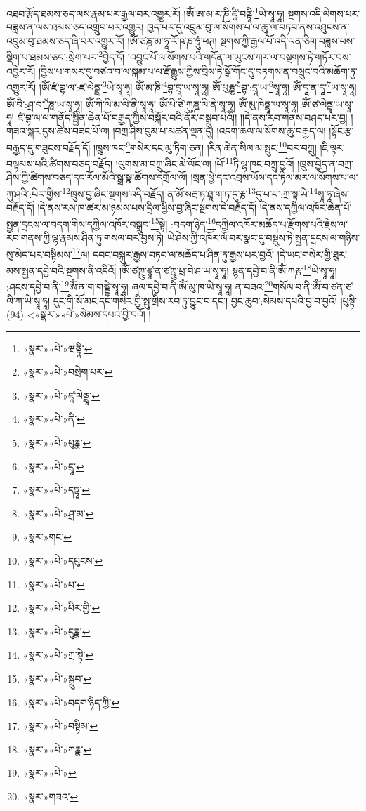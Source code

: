 འཐབ་རྩོད་ཐམས་ཅད་ལས་རྣམ་པར་རྒྱལ་བར་འགྱུར་རོ། །ཨོཾ་ཨ་མ་ར་ཎི་ཛཱི་བནྟཱི་\footnote{«སྣར་»«པེ་»ཝནྟཱི་}ཡེ་སྭཱ་ཧཱ། སྔགས་འདི་ལེགས་པར་བཟླས་ན་ལས་ཐམས་ཅད་འགྲུབ་པར་འགྱུར། ཁྱད་པར་དུ་འབྲུམ་བུ་ལ་སོགས་པ་ལ་ཆུ་ལ་བཏབ་ནས་འཐུངས་ན་འབྲུམ་བུ་ཐམས་ཅད་ཞི་བར་འགྱུར་རོ། །ཨོཾ་ཙཎྜ་མ་ཧཱ་རོ་ཥ་ཎ་ཧཱུཾ་ཕཊ། སྔགས་ཀྱི་རྒྱལ་པོ་འདི་ལན་ཅིག་བཟླས་པས་སྡིག་པ་ཐམས་ཅད་:སྲེག་པར་\footnote{«སྣར་»«པེ་»བསྲེག་པར་}བྱེད་དོ། །འབྱུང་པོ་ལ་སོགས་པའི་གདོན་ལ་ཡུངས་ཀར་ལ་བསྔགས་ཏེ་གཏོར་བས་འབྱེར་རོ། །བྱིས་པ་གསར་དུ་བཙའ་བ་ལ་སྐམ་པ་ལ་རྡོ་རྒྱུས་ཀྱིས་བྲིས་ཏེ་སྒོ་གོང་དུ་བཏགས་ན་བསྲུང་བའི་མཆོག་ཏུ་འགྱུར་རོ། །ཨོཾ་ཛཾ་བྷ་ལ་:ཛ་ལེནྡྲ་\footnote{«སྣར་»«པེ་»ཛཱ་ལེནྡྲཱ་}ཡེ་སྭཱ་ཧཱ། ཨོཾ་མ་ཎི་\footnote{«སྣར་»«པེ་»ནི་}བྷ་དྲཱ་ཡ་སྭཱ་ཧཱ། ཨོཾ་པུརྞྞ་\footnote{«སྣར་»«པེ་»པུརྞྣ་}བྷ་:དྲཱ་ཡ་\footnote{«སྣར་»«པེ་»དྲཱ་}སྭཱ་ཧཱ། ཨོཾ་དཱ་ན་དཱ་\footnote{«སྣར་»«པེ་»དཏྟཱ་}ཡ་སྭཱ་ཧཱ། ཨོཾ་བཻ་:ཤྲ་བ་\footnote{«སྣར་»«པེ་»ཤྲ་མ་}ཎཱ་ཡ་སྭཱ་ཧཱ། ཨོཾ་ཀི་ལི་མ་ལི་ནི་སྭཱ་ཧཱ། ཨོཾ་པི་ཙི་ཀུཎྜ་ལི་ནེ་སྭཱ་ཧཱ། ཨོཾ་མུ་ཁེནྡྲཱ་ཡ་སྭཱ་ཧཱ། ཨོཾ་ཙ་ལེནྡཱ་ཡ་སྭཱ་ཧཱ། ཛཾ་བྷ་ལ་ལ་གནོད་སྦྱིན་ཆེན་པོ་བརྒྱད་ཀྱིས་བསྐོར་བའི་ནོར་བསྒྲུབ་པའོ།། །།དེ་ནས་རབ་གནས་བཤད་པར་བྱ། །གཟའ་སྐར་དུས་ཚེས་བཟང་པོ་ལ། །བཀྲ་ཤིས་བུམ་པ་མཚན་ལྡན་དུ། །འདག་ཆལ་ལ་སོགས་ཆུ་བརྒྱད་ལ། །སྟོང་རྩ་བརྒྱད་དུ་གཟུངས་བརྗོད་དོ། །ཁྲུས་ཁང་\footnote{«སྣར་»གང་}གསེར་དང་མུ་ཏིག་ཅན། །རིན་ཆེན་སིལ་མ་སྤུང་\footnote{«སྣར་»«པེ་»དཔུངས་}བར་བཀྲུ། །ཇི་ལྟར་བལྟམས་པའི་ཚིགས་བཅད་བརྗོད། །ལུགས་མ་བཀྲུ་ཞིང་མེ་ལོང་ལ། །པོ་\footnote{«སྣར་»«པེ་»པ་}ཏི་ལྷ་ཁང་བཀྲུ་བྱའོ། །ཁྲུས་བྱེད་ན་བཀྲ་ཤིས་ཀྱི་ཚིགས་བཅད་དང་རོལ་མོའི་སྒྲ་སྣ་ཚོགས་དགྲོལ་ལོ། །སྲན་ཕྱེ་དང་འབྲས་ཡོས་དང་ཏིལ་མར་ལ་སོགས་པ་ལ་ཀུ་ཤའི་:པིར་གྱིས་\footnote{«སྣར་»«པེ་»པིར་གྱི་}ཁྲུས་བྱ་ཞིང་སྔགས་འདི་བརྗོད། ན་མོ་སརྦ་ཏ་ཐཱ་ག་ཏ་དུ་རྞ་\footnote{«སྣར་»«པེ་»དུརྞྣ་}དུ་པ་པ་:ཀྲ་སྟ་ཡེ་\footnote{«སྣར་»«པེ་»ཀྲ་སྟེ་}སྭཱ་ཧཱ་ཞེས་བརྗོད་དོ། །དེ་ནས་རས་ཁ་ཚར་མ་ཉམས་པས་དྲིལ་ཕྱིས་བྱ་ཞིང་སྔགས་དེ་བརྗོད་དོ། །དེ་ནས་དཀྱིལ་འཁོར་ཆེན་པོ་སྤྱན་དྲངས་ལ་བདག་གིས་དཀྱིལ་འཁོར་བསྒྲུབ་\footnote{«སྣར་»«པེ་»སྒྲུབ་}སྟེ། :བདག་ཉིད་\footnote{«སྣར་»«པེ་»བདག་ཉིད་ཀྱི་}དཀྱིལ་འཁོར་མཆོད་པ་རྫོགས་པའི་རྗེས་ལ་རབ་གནས་ཀྱི་ལྷ་རྣམས་ཤིན་ཏུ་གསལ་བར་བྱས་ཏེ། ཡེ་ཤེས་ཀྱི་འཁོར་ལོ་བར་སྣང་དུ་བསྡུས་ཏེ་སྤྱན་དྲངས་ལ་གཉིས་སུ་མེད་པར་བསྟིམས་\footnote{«སྣར་»«པེ་»བསྟིམ་}ལ། དབང་བསྐུར་རྒྱས་བཏབ་ལ་མཆོད་པ་ཤིན་ཏུ་རྒྱས་པར་བྱའོ། །དེ་ཡང་གསེར་གྱི་ཐུར་མས་སྤྱན་དབྱེ་བའི་སྔགས་ནི་འདིའོ། །ཨོཾ་ཙཀྵུ་ཛྙཱ་ན་ཙཀྵུ་པྲ་བེ་ཤ་ཡ་སྭཱ་ཧཱ། སྙན་དབྱེ་བ་ནི་ཨོཾ་ཀརྞ་\footnote{«སྣར་»«པེ་»ཀརྞྣ་}ཡེ་སྭཱ་ཧཱ། :ཤངས་དབྱེ་བ་ནི་\footnote{«སྣར་»«པེ་»}ཨོཾ་ན་ག་གནྡྷེ་སྭཱ་ཧཱ། ཞལ་དབྱེ་བ་ནི་ཨོཾ་མུ་ཁ་ཡེ་སྭཱ་ཧཱ། ན་བཟའ་\footnote{«སྣར་»གཟའ་}གསོལ་བ་ནི་ཨོཾ་བ་ཙན་ཙ་ལི་ཀ་ཡེ་སྭཱ་ཧཱ། དུང་གི་སོ་མང་དང་གསེར་གྱི་སྤུ་གྲིས་རབ་ཏུ་བྱུང་བ་དང་། བྱང་ཆུབ་:སེམས་དཔའི་བྱ་བ་བྱའོ། །པུསྟི་(94) <«སྣར་»«པེ་»སེམས་དཔའ་བྱི་བའོ། །
